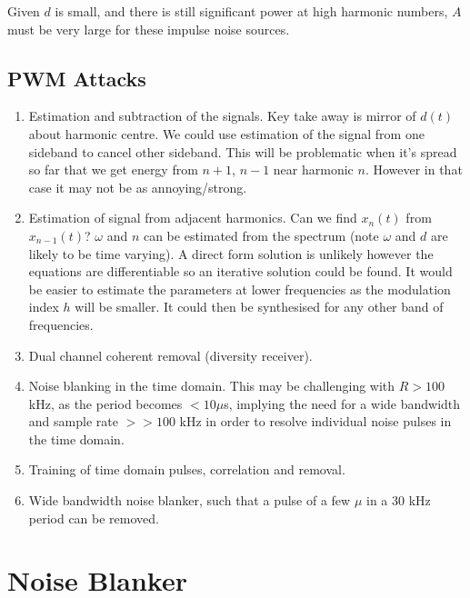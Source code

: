 \documentclass{article}
\begin{document}
Given $d$ is small, and there is still significant power at high harmonic numbers, $A$ must be very large for these impulse noise sources.

\subsection{PWM Attacks}

\begin{enumerate}
\item Estimation and subtraction of the signals. Key take away is mirror of $d(t)$ about harmonic centre.  We could use estimation of the signal from one sideband to cancel other sideband. This will be problematic when it's spread so far that we get energy from $n+1$, $n-1$ near harmonic $n$.  However in that case it may not be as annoying/strong.

\item Estimation of signal from adjacent harmonics.  Can we find $x_n(t)$ from $x_{n-1}(t)$?  $\omega$ and $n$ can be estimated from the spectrum (note $\omega$ and $d$ are likely to be time varying). A direct form solution is unlikely however the equations are differentiable so an iterative solution could be found.  It would be easier to estimate the parameters at lower frequencies as the modulation index $h$ will be smaller.  It could then be synthesised for any other band of frequencies. 

\item Dual channel coherent removal (diversity receiver).

\item Noise blanking in the time domain.  This may be challenging with $R>100$ kHz, as the period becomes $< 10\mu$s, implying the need for a wide bandwidth and sample rate $>>100$ kHz in order to resolve individual noise pulses in the time domain.

\item Training of time domain pulses, correlation and removal.

\item Wide bandwidth noise blanker, such that a pulse of a few $\mu$ in a 30 kHz period can be removed.

\end{enumerate}

\section{Noise Blanker}
\label{blanker}
\end{document}

